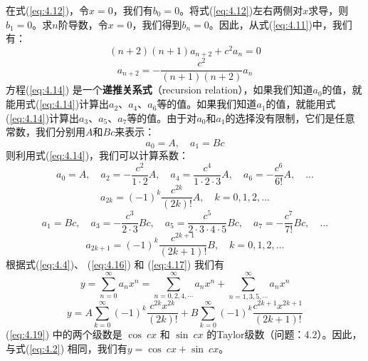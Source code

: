     在式(\ref{eq:4.12})，令$x=0$，我们有$b_0=0$。将式(\ref{eq:4.12})左右两侧对$x$求导，则$b_1=0$。求$n$阶导数，令$x=0$，我们得到$b_n=0$。因此，从式(\ref{eq:4.11})中，我们有：
    \begin{equation}
        \left(n+2\right)\left(n+1\right)a_{n+2} + c^2 a_n = 0
        \label{eq:4.13}
    \end{equation}
    \begin{equation}
        a_{n+2} = -\frac{c^2}{\left(n+1\right)\left(n+2\right)}a_n
        \label{eq:4.14}
    \end{equation}
    方程(\ref{eq:4.14}) 是一个\textbf{递推关系式}（recursion relation），如果我们知道$a_0$的值，就能用式(\ref{eq:4.14})计算出$a_2$、$a_4$、$a_6$等的值。如果我们知道$a_1$的值，就能用式(\ref{eq:4.14})计算出$a_3$、$a_5$、$a_7$等的值。由于对$a_0$和$a_1$的选择没有限制，它们是任意常数，我们分别用$A$和$Bc$来表示：
    \begin{equation}
        a_0 = A, \quad a_1 = Bc
        \label{eq:4.15}
    \end{equation}
    则利用式(\ref{eq:4.14})，我们可以计算系数：
    \begin{equation*}
        a_0 = A, \quad a_2 = -\frac{c^2}{1 \cdot 2}A, \quad a_4 = \frac{c^4}{1 \cdot 2\cdot 3}A, \quad a_6 = -\frac{c^6}{6!}A, \quad \ldots
    \end{equation*}
    \begin{equation}
        a_{2k} = (-1)^k \frac{c^{2k}}{(2k)!}A, \quad k = 0, 1, 2, \ldots
        \label{eq:4.16}
    \end{equation}
    \begin{equation*}
        a_1 = Bc, \quad a_3 = -\frac{c^3}{2 \cdot 3}Bc, \quad a_5 = \frac{c^5}{2 \cdot 3 \cdot 4 \cdot 5}Bc, \quad a_7 = -\frac{c^7}{7!}Bc, \quad \ldots
    \end{equation*}
    \begin{equation}
        a_{2k+1} = (-1)^k \frac{c^{2k+1}}{(2k+1)!}B, \quad k = 0, 1, 2, \ldots
        \label{eq:4.17}
    \end{equation}
    根据式(\ref{eq:4.4})、 (\ref{eq:4.16}) 和 (\ref{eq:4.17}) 我们有
    \begin{equation}
        y = \sum_{n=0}^{\infty}a_nx^n = \sum_{n=0,2,4, \cdots}^{\infty}a_nx^n + \sum_{n=1,3,5, \cdots}^{\infty}a_nx^n
        \label{eq:4.18}
    \end{equation}
    \begin{equation}
        y = A\sum_{k=0}^{\infty}(-1)^k\frac{c^{2k}x^{2k}}{(2k)!} + B\sum_{k=0}^{\infty}(-1)^k\frac{c^{2k+1}x^{2k+1}}{(2k+1)!}
        \label{eq:4.19}
    \end{equation}
    (\ref{eq:4.19}) 中的两个级数是 $\cos\: cx$ 和 $\sin\: cx$ 的Taylor级数（问题：4.2）。因此，与式(\ref{eq:4.2}) 相同，我们有$y = \cos\: cx + \sin\: cx$。

